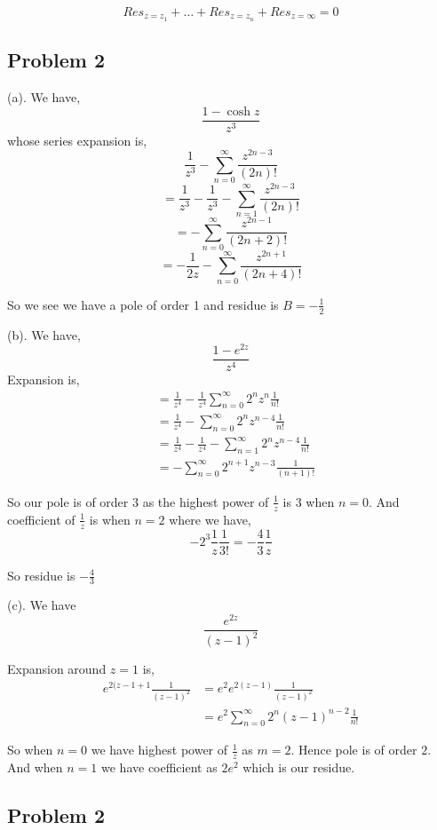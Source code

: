 \documentclass[a4paper]{report}
\begin{document}
$$  Res_{z=z_1} + \dots + Res_{z = z_n}+ Res_{z=\infty}  = 0$$ 



\subsection*{Problem 2}
(a).  We have, 
$$ \frac{1 - \cosh z}{z^{3}} $$  whose series expansion is, 
$$ \frac{1}{z^{3}} - \sum_{n=0}^{\infty} \frac{z^{2n - 3}}{(2n)!} $$ 
$$ =\frac{1}{z^{3}} - \frac{1}{z^{3}} - \sum_{n=1}^{\infty} \frac{z^{2n - 3}}{(2n)!} $$ 
$$ = -\sum_{n=0}^{\infty} \frac{z^{2n - 1}}{(2n + 2)!} $$ 
$$ = -\frac{1}{2z} - \sum_{n=0}^{\infty} \frac{z^{2n + 1}}{(2n + 4)!} $$ 


So we see we have a pole of order 1 and residue is $B = -\frac{1}{2}$ 

(b). We have,  
$$ \frac{1 - e^{2z}}{z^{4}} $$ 
Expansion is, 
\begin{align*}
 &=\frac{1}{z^{4}} - \frac{1}{z^{4}} \sum_{n=0}^{\infty} 2^{n}z^{n} \frac{1}{n!}\\
 &= \frac{1}{z^{4}} - \sum_{n=0}^{\infty} 2^{n}z^{n - 4}\frac{1}{n!}\\
 &= \frac{1}{z^{4}} - \frac{1}{z^{4}} - \sum_{n=1}^{\infty} 2^{n}z^{n - 4}\frac{1}{n!}\\
 &= -\sum_{n=0}^{\infty} 2^{n + 1}z^{n - 3}\frac{1}{(n+1)!}
\end{align*}

So our pole is of order 3 as the highest power of $\frac{1}{z}$ is $3$ when $n = 0$. And  coefficient of $\frac{1}{z}$ is when $n = 2$ where we have, 
$$ -2^{3}\frac{1}{z}\frac{1}{3!} = -\frac{4}{3} \frac{1}{z} $$ 

So residue is $-\frac{4}{3}$ 


(c). We have $$\frac{e^{2z}}{(z - 1)^2}$$

Expansion around $z = 1$ is, 
\begin{align*}
    e^{2(z-1 + 1} \frac{1}{(z-1)^2} &= e^2e^{2(z - 1)} \frac{1}{(z -1)^2}\\
                                    &= e^2 \sum_{n=0}^{\infty} 2^{n}(z-1)^{n-2} \frac{1}{n!}
\end{align*}

So when $n = 0$ we have highest power of $\frac{1}{z}$ as $m= 2$. Hence pole is of order $2$. And when $n = 1$ we have coefficient as  $2e^2$ which is our residue.

\subsection*{Problem 2}
\end{document}
